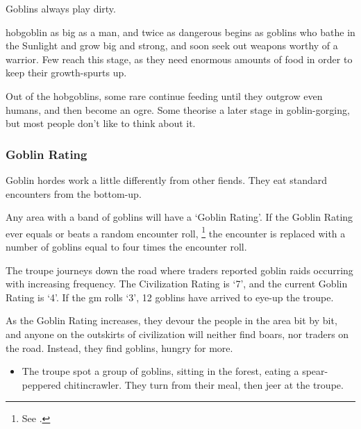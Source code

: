 \begin{multicols}{2}
Goblins always play dirty.


  {hobgoblin}%
  {as big as a man, and twice as dangerous}%
begins as goblins who bathe in the Sunlight and grow big and strong, and soon seek out weapons worthy of a warrior.
Few reach this stage, as they need enormous amounts of food in order to keep their growth-spurts up.

Out of the hobgoblins, some rare continue feeding until they outgrow even humans, and then become an ogre.
Some theorise a later stage in goblin-gorging, but most people don't like to think about it.


\subsubsection{Goblin Rating}
\label{goblin_rating}

Goblin hordes work a little differently from other fiends.
They eat standard encounters from the bottom-up.

Any area with a band of goblins will have a `Goblin Rating'.
If the Goblin Rating ever equals or beats a random encounter roll,%
\footnote{See .}
the encounter is replaced with a number of goblins equal to four times the encounter roll.

\begin{exampletext}
  The troupe journeys down the road where traders reported goblin raids occurring with increasing frequency.
  The Civilization Rating is `7', and the current Goblin Rating is `4'.
  If the \gls{gm} rolls `3', 12 goblins have arrived to eye-up the troupe.
\end{exampletext}

\exampleGoblinEnc

As the Goblin Rating increases, they devour the people in the area bit by bit, and anyone on the outskirts of civilization will neither find boars, nor traders on the road.
Instead, they find goblins, hungry for more.



\showEnc[N]

\begin{itemize}
  \item
  The troupe spot a group of goblins, sitting in the forest, eating a spear-peppered chitincrawler.
  They turn from their meal, then jeer at the troupe.


\end{itemize}
\end{multicols}
